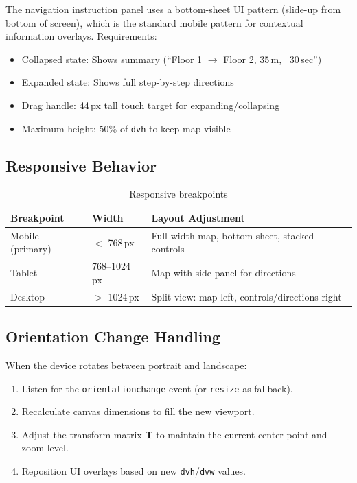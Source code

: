The navigation instruction panel uses a bottom-sheet UI pattern (slide-up from bottom of screen), which is the standard mobile pattern for contextual information overlays. Requirements:

\begin{itemize}
  \item Collapsed state: Shows summary (``Floor 1 $\rightarrow$ Floor 2, 35\,m, ~30\,sec'')
  \item Expanded state: Shows full step-by-step directions
  \item Drag handle: 44\,px tall touch target for expanding/collapsing
  \item Maximum height: 50\% of \texttt{dvh} to keep map visible
\end{itemize}

\subsection{Responsive Behavior}

\begin{table}[H]
\centering
\caption{Responsive breakpoints}
\begin{tabularx}{0.9\textwidth}{llX}
\toprule
\textbf{Breakpoint} & \textbf{Width} & \textbf{Layout Adjustment} \\
\midrule
Mobile (primary) & $<$ 768\,px & Full-width map, bottom sheet, stacked controls \\
Tablet & 768--1024\,px & Map with side panel for directions \\
Desktop & $>$ 1024\,px & Split view: map left, controls/directions right \\
\bottomrule
\end{tabularx}
\end{table}

\subsection{Orientation Change Handling}

When the device rotates between portrait and landscape:

\begin{enumerate}
  \item Listen for the \texttt{orientationchange} event (or \texttt{resize} as fallback).
  \item Recalculate canvas dimensions to fill the new viewport.
  \item Adjust the transform matrix $\mathbf{T}$ to maintain the current center point and zoom level.
  \item Reposition UI overlays based on new \texttt{dvh}/\texttt{dvw} values.
\end{enumerate}


